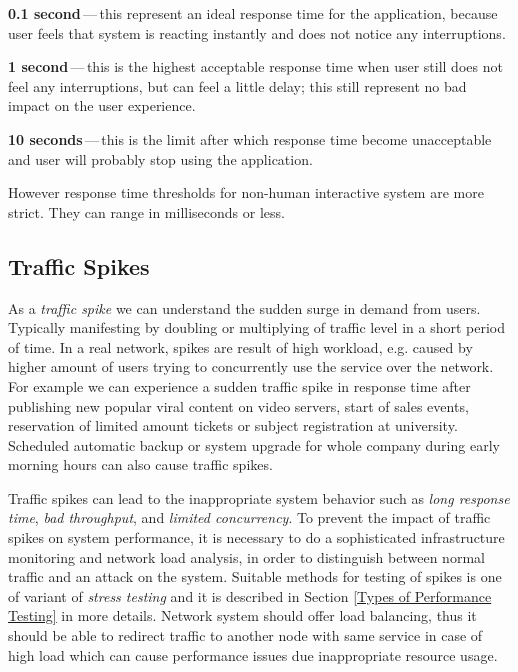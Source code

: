 \begin{description}
	\setlength\itemsep{0em}
	\item \textbf{0.1 second}\,---\,this represent an ideal response time for the application, because user feels that system is reacting instantly and does not notice any interruptions.
	\item \textbf{1 second}\,---\,this is the highest acceptable response time when user still does not feel any interruptions, but can feel a little delay; this still represent no bad impact on the user experience.
	\item \textbf{10 seconds}\,---\,this is the limit after which response time become unacceptable and user will probably stop using the application.
\end{description}

However response time thresholds for non-human interactive system are more strict. They can range in milliseconds or less.


\subsection*{Traffic Spikes}
As a \emph{traffic spike} \cite{Kurkova:Thesis:2017, AMC:SPIKES} we can understand the sudden surge in demand from users. Typically manifesting by doubling or multiplying of traffic level in a short period of time. In a real network, spikes are result of high workload, e.g. caused by higher amount of users trying to concurrently use the service over the network. For example we can experience a sudden traffic spike in response time after publishing new popular viral content on video servers, start of sales events, reservation of limited amount tickets or subject registration at university. Scheduled automatic backup or system upgrade for whole company during early morning hours can also cause traffic spikes.

Traffic spikes can lead to the inappropriate system behavior such as \emph{long response time}, \emph{bad throughput}, and \emph{limited concurrency}. To prevent the impact of traffic spikes on system performance, it is necessary to do a sophisticated infrastructure monitoring and network load analysis, in order to distinguish between normal traffic and an attack on the system. Suitable methods for testing of spikes is one of variant of \emph{stress testing} \cite{Manzor:APTB} and it is described in Section \ref{Types of Performance Testing} in more details. Network system should offer load balancing, thus it should be able to redirect traffic to another node with same service in case of high load which can cause performance issues due inappropriate resource usage.


